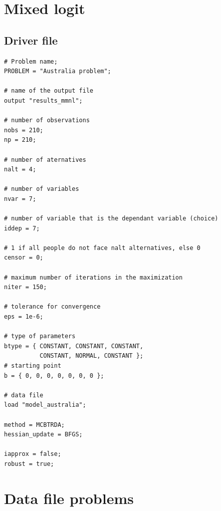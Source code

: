 \documentclass[11pt]{report}
\begin{document}
\section{Mixed logit}

\subsection{Driver file}

\begin{verbatim}
# Problem name;
PROBLEM = "Australia problem";

# name of the output file
output "results_mmnl";

# number of observations
nobs = 210;
np = 210;

# number of aternatives
nalt = 4;

# number of variables
nvar = 7;

# number of variable that is the dependant variable (choice)
iddep = 7;

# 1 if all people do not face nalt alternatives, else 0
censor = 0;

# maximum number of iterations in the maximization
niter = 150;

# tolerance for convergence
eps = 1e-6;

# type of parameters
btype = { CONSTANT, CONSTANT, CONSTANT,
          CONSTANT, NORMAL, CONSTANT };
# starting point
b = { 0, 0, 0, 0, 0, 0, 0 };

# data file
load "model_australia";

method = MCBTRDA;
hessian_update = BFGS;

iapprox = false;
robust = true;
\end{verbatim}



\section{Data file problems}






\begin{small}
\printindex
\end{small}
\end{document}
